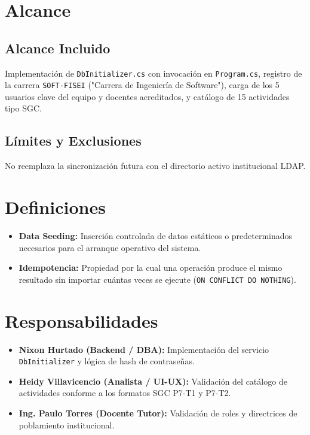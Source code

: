 \documentclass[12pt,a4paper]{article}
\begin{document}
\section{Alcance}

\subsection{Alcance Incluido}
Implementación de \texttt{DbInitializer.cs} con invocación en \texttt{Program.cs}, registro de la carrera \texttt{SOFT-FISEI} ("Carrera de Ingeniería de Software"), carga de los 5 usuarios clave del equipo y docentes acreditados, y catálogo de 15 actividades tipo SGC.

\subsection{Límites y Exclusiones}
No reemplaza la sincronización futura con el directorio activo institucional LDAP.

\section{Definiciones}
\begin{itemize}[leftmargin=1.5em, itemsep=2pt, topsep=2pt]
    \item \textbf{Data Seeding:} Inserción controlada de datos estáticos o predeterminados necesarios para el arranque operativo del sistema.
    \item \textbf{Idempotencia:} Propiedad por la cual una operación produce el mismo resultado sin importar cuántas veces se ejecute (\texttt{ON CONFLICT DO NOTHING}).
\end{itemize}

\section{Responsabilidades}
\begin{itemize}[leftmargin=1.5em, itemsep=2pt, topsep=2pt]
    \item \textbf{Nixon Hurtado (Backend / DBA):} Implementación del servicio \texttt{DbInitializer} y lógica de hash de contraseñas.
    \item \textbf{Heidy Villavicencio (Analista / UI-UX):} Validación del catálogo de actividades conforme a los formatos SGC P7-T1 y P7-T2.
    \item \textbf{Ing. Paulo Torres (Docente Tutor):} Validación de roles y directrices de poblamiento institucional.
\end{itemize}
\end{document}

